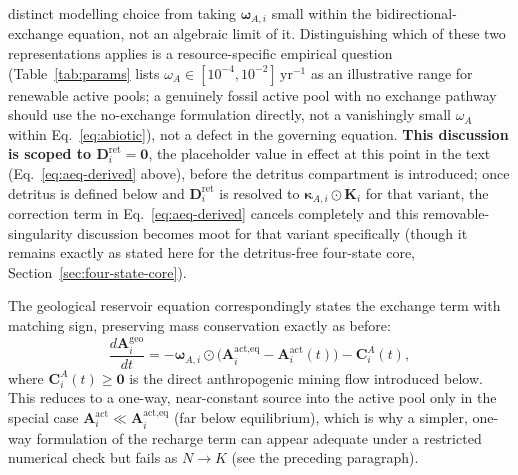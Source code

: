\documentclass[twocolumn,10pt]{article}
\begin{document}
distinct modelling choice from taking $\boldsymbol\omega_{A,i}$ small within the bidirectional-exchange equation, not an algebraic limit of it. Distinguishing which of these two representations applies is a resource-specific empirical question (Table~\ref{tab:params} lists $\omega_A\in[10^{-4},10^{-2}]\,\text{yr}^{-1}$ as an illustrative range for renewable active pools; a genuinely fossil active pool with no exchange pathway should use the no-exchange formulation directly, not a vanishingly small $\omega_A$ within Eq.~\eqref{eq:abiotic}), not a defect in the governing equation. \textbf{This discussion is scoped to $\mathbf D^{\text{ret}}_i=\mathbf 0$}, the placeholder value in effect at this point in the text (Eq.~\eqref{eq:aeq-derived} above), before the detritus compartment is introduced; once detritus is defined below and $\mathbf D^{\text{ret}}_i$ is resolved to $\boldsymbol\kappa_{A,i}\odot\mathbf K_i$ for that variant, the correction term in Eq.~\eqref{eq:aeq-derived} cancels completely and this removable-singularity discussion becomes moot for that variant specifically (though it remains exactly as stated here for the detritus-free four-state core, Section~\ref{sec:four-state-core}).

The geological reservoir equation correspondingly states the exchange term with matching sign, preserving mass conservation exactly as before:
\begin{equation}
\frac{d\mathbf{A}^{\text{geo}}_i}{dt} = -\boldsymbol\omega_{A,i}\odot\bigl(\mathbf A^{\text{act},\text{eq}}_i-\mathbf{A}^{\text{act}}_i(t)\bigr) - \mathbf{C}^A_i(t), \label{eq:abiotic-geo}
\end{equation}
where $\mathbf C^A_i(t)\ge\mathbf 0$ is the direct anthropogenic mining flow introduced below. This reduces to a one-way, near-constant source into the active pool only in the special case $\mathbf A^{\text{act}}_i\ll\mathbf A^{\text{act},\text{eq}}_i$ (far below equilibrium), which is why a simpler, one-way formulation of the recharge term can appear adequate under a restricted numerical check but fails as $N\to K$ (see the preceding paragraph).
\end{document}
